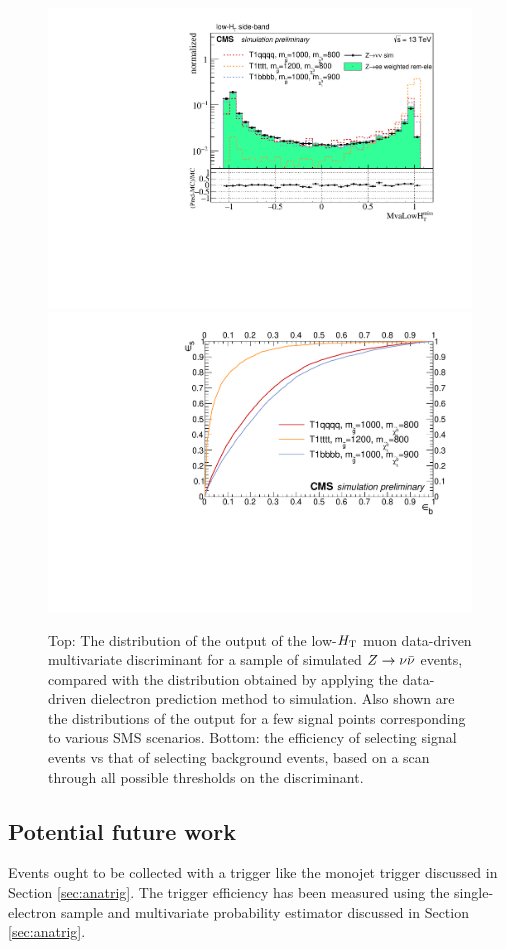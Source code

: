 \begin{figure}[tb!]
\centering
\includegraphics[width=0.7\linewidth]{figures/SusySearches/MvaLowHt.pdf}
\includegraphics[width=0.7\linewidth]{figures/SusySearches/RocCurvesLowHt_ZinvVsSUSY.pdf}
\caption{Top: The distribution of the output of the low-$H_{\rm T}$ muon data-driven multivariate discriminant for a sample of simulated $Z\rightarrow \nu\bar{\nu}$ events, compared with the distribution obtained by applying the data-driven dielectron prediction method to simulation. Also shown are the distributions of the output for a few signal points corresponding to various SMS scenarios. Bottom: the efficiency of selecting signal events vs that of selecting background events, based on a scan through all possible thresholds on the discriminant.}
\label{fig:SusyBdt2}
\end{figure}

\subsection{Potential future work}

Events ought to be collected with a trigger like the monojet trigger discussed in Section \ref{sec:anatrig}. The trigger efficiency has been measured using the single-electron sample and multivariate probability estimator discussed in Section \ref{sec:anatrig}. 

